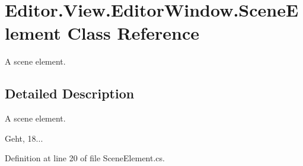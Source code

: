 \section{Editor.\-View.\-Editor\-Window.\-Scene\-Element Class Reference}
\label{class_editor_1_1_view_1_1_editor_window_1_1_scene_element}


A scene element.  




\subsection{Detailed Description}
A scene element. 

Geht, 18... 

Definition at line 20 of file Scene\-Element.\-cs.

